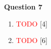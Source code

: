 \noindent
\textbf{Question 7}
\begin{enumerate}[label=(\roman*)]

    \item \textcolor{red}{TODO} \hfill [4]

    \item \textcolor{red}{TODO} \hfill [6]

\end{enumerate}


